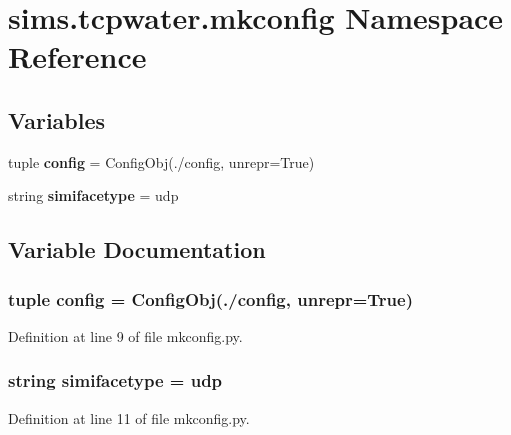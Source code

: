 \section{sims.\+tcpwater.\+mkconfig Namespace Reference}
\label{namespacesims_1_1tcpwater_1_1mkconfig}
\subsection*{Variables}
\begin{DoxyCompactItemize}
\item 
tuple {\bf config} = Config\+Obj(\textquotesingle{}./config\textquotesingle{}, unrepr=True)
\item 
string {\bf simifacetype} = \textquotesingle{}udp\textquotesingle{}
\end{DoxyCompactItemize}


\subsection{Variable Documentation}
\subsubsection[{config}]{\setlength{\rightskip}{0pt plus 5cm}tuple config = Config\+Obj(\textquotesingle{}./config\textquotesingle{}, unrepr=True)}\label{namespacesims_1_1tcpwater_1_1mkconfig_ad5f91786d7c873886a576621a2c1b0b5}


Definition at line 9 of file mkconfig.\+py.

\subsubsection[{simifacetype}]{\setlength{\rightskip}{0pt plus 5cm}string simifacetype = \textquotesingle{}udp\textquotesingle{}}\label{namespacesims_1_1tcpwater_1_1mkconfig_a7f5f5e89422cd15dfc1af6d7593d69c7}


Definition at line 11 of file mkconfig.\+py.


